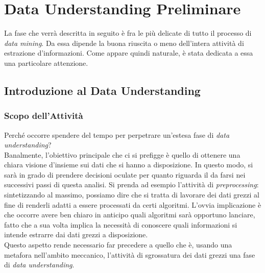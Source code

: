 
\chapter{Data Understanding Preliminare}

La fase che verrà descritta in seguito è fra le più delicate di tutto il processo di \textit{data mining}. Da essa dipende la buona riuscita o meno dell'intera attività di estrazione d'informazioni. Come appare quindi naturale, è stata dedicata a essa una particolare attenzione.

    \section{Introduzione al Data Understanding}

        \subsection{Scopo dell'Attività}

            Perché occorre spendere del tempo per perpetrare un'estesa fase di \textit{data understanding}? \\

            Banalmente, l'obiettivo principale che ci si prefigge è quello di ottenere una chiara visione d'insieme sui dati che si hanno a disposizione. In questo modo, si sarà in grado di prendere decisioni oculate per quanto riguarda il da farsi nei successivi passi di questa analisi. Si prenda ad esempio l'attività di \textit{preprocessing}: sintetizzando al massimo, possiamo dire che si tratta di lavorare dei dati grezzi al fine di renderli adatti a essere processati da certi algoritmi. L'ovvia implicazione è che occorre avere ben chiaro in anticipo quali algoritmi sarà opportuno lanciare, fatto che a sua volta implica la necessità di conoscere quali informazioni si intende estrarre dai dati grezzi a disposizione. \\

            Questo aspetto rende necessario far precedere a quello che è, usando una metafora nell'ambito meccanico, l'attività di sgrossatura dei dati grezzi una fase di \textit{data understanding}. \\


